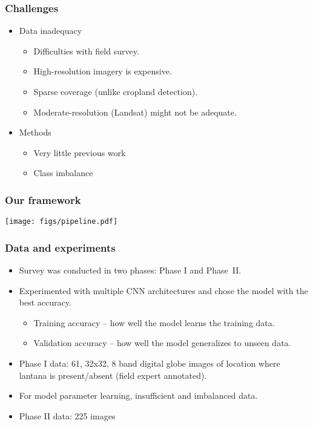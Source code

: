 \documentclass[xcolor=table,xcolor=dvipsnames]{beamer}
\begin{document}
\begin{frame}
\frametitle{Challenges} 
\begin{itemize}
    \item Data inadequacy
    \begin{itemize}
    \item Difficulties with field survey.
    \item High-resolution imagery is expensive.
    \item Sparse coverage (unlike cropland detection).
    \item Moderate-resolution (Landsat) might not be adequate.
    \end{itemize}
    \item Methods
    \begin{itemize}
        \item Very little previous work
        \item Class imbalance
    \end{itemize}
\end{itemize}
\end{frame}
\begin{frame}
\frametitle{Our framework} 
{
\centering
\texttt{[image: figs/pipeline.pdf]}
}
\end{frame}
\begin{frame}
\frametitle{Data and experiments} 
\begin{itemize}
    \item Survey was conducted in two phases: Phase I and Phase~II.
    \item Experimented with multiple CNN architectures and chose the model with the best accuracy.
    \begin{itemize}
\item Training accuracy – how well the model learns the training data.
\item Validation accuracy – how well the model generalizes to unseen data.
\end{itemize}
\item Phase I data: 61, 32x32, 8 band digital globe images of location where lantana is present/absent (field expert annotated).
\item For model parameter learning, insufficient and imbalanced data.
\item Phase II data: 225 images
\end{itemize}
\end{frame}
\end{document}
